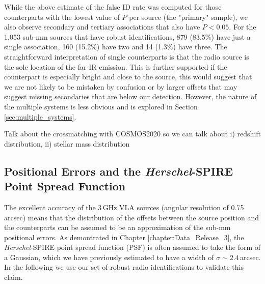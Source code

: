 While the above estimate of the false ID rate was computed for those counterparts with the lowest value of $P$ per source (the "primary" sample), we also observe secondary and tertiary associations that also have $P < 0.05$. For the 1,053 sub-mm sources that have robust identifications, 879 (83.5\%) have just a single association, 160 (15.2\%) have two and 14 (1.3\%) have three. The straightforward interpretation of single counterparts is that the radio source is the sole location of the far-IR emission. This is further supported if the counterpart is especially bright and close to the source, this would suggest that we are not likely to be mistaken by confusion or by larger offsets that may suggest missing secondaries that are below our detection. However, the nature of the multiple systems is less obvious and is explored in Section \ref{sec:multiple_systems}.

{\color{red}Talk about the crossmatching with COSMOS2020 so we can talk about i) redshift distribution, ii) stellar mass distribution}

\subsection{Positional Errors and the \textit{Herschel}-SPIRE Point Spread Function}

The excellent accuracy of the 3\,GHz VLA sources (angular resolution of 0.75\,arcsec) means that the distribution of the offsets between the source position and the counterparts can be assumed to be an approximation of the sub-mm positional errors. As demontrated in Chapter \ref{chapter:Data_Release_3}, the \textit{Herschel}-SPIRE point spread function (PSF) is often assumed to take the form of a Gaussian, which we have previously estimated to have a width of $\sigma \sim 2.4$\,arcsec. In the following we use our set of robust radio identifications to validate this claim.

